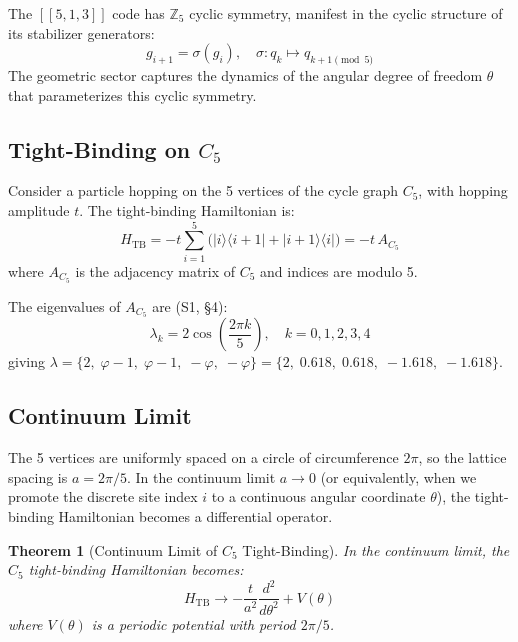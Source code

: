 \documentclass[11pt,a4paper]{article}
\newtheorem{theorem}{Theorem}[section]
\theoremstyle{definition}
\theoremstyle{remark}
\newcommand{\gr}{\varphi}
\begin{document}
The $[[5,1,3]]$ code has $\mathbb{Z}_5$ cyclic symmetry, manifest in the cyclic structure of its stabilizer generators:
\begin{equation}
g_{i+1} = \sigma(g_i), \quad \sigma: q_k \mapsto q_{k+1\pmod{5}}
\end{equation}
The geometric sector captures the dynamics of the angular degree of freedom $\theta$ that parameterizes this cyclic symmetry.

\subsection{Tight-Binding on $C_5$}

Consider a particle hopping on the 5 vertices of the cycle graph $C_5$, with hopping amplitude $t$. The tight-binding Hamiltonian is:
\begin{equation}
H_{\mathrm{TB}} = -t\sum_{i=1}^{5}\Big(|i\rangle\langle i{+}1| + |i{+}1\rangle\langle i|\Big) = -t\,A_{C_5}
\end{equation}
where $A_{C_5}$ is the adjacency matrix of $C_5$ and indices are modulo 5.

The eigenvalues of $A_{C_5}$ are (S1, \S4):
\begin{equation}
\lambda_k = 2\cos\!\left(\frac{2\pi k}{5}\right), \quad k = 0,1,2,3,4
\end{equation}
giving $\lambda = \{2,\; \gr{-}1,\; \gr{-}1,\; {-}\gr,\; {-}\gr\} = \{2,\; 0.618,\; 0.618,\; {-}1.618,\; {-}1.618\}$.

\subsection{Continuum Limit}

The 5 vertices are uniformly spaced on a circle of circumference $2\pi$, so the lattice spacing is $a = 2\pi/5$. In the continuum limit $a \to 0$ (or equivalently, when we promote the discrete site index $i$ to a continuous angular coordinate $\theta$), the tight-binding Hamiltonian becomes a differential operator.

\begin{theorem}[Continuum Limit of $C_5$ Tight-Binding]
\label{thm:continuum}
In the continuum limit, the $C_5$ tight-binding Hamiltonian becomes:
\begin{equation}
H_{\mathrm{TB}} \to -\frac{t}{a^2}\frac{d^2}{d\theta^2} + V(\theta)
\end{equation}
where $V(\theta)$ is a periodic potential with period $2\pi/5$.
\end{theorem}
\end{document}
